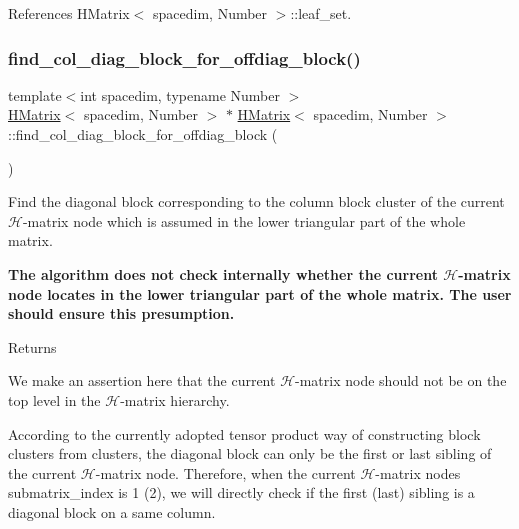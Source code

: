 References H\+Matrix$<$ spacedim, Number $>$\+::leaf\+\_\+set.

\mbox{\label{classHMatrix_a1ab763860706b9cbef8f5e73d995f29a}} 
\subsubsection{\texorpdfstring{find\+\_\+col\+\_\+diag\+\_\+block\+\_\+for\+\_\+offdiag\+\_\+block()}{find\_col\_diag\_block\_for\_offdiag\_block()}}
{\footnotesize\ttfamily template$<$int spacedim, typename Number $>$ \\
\hyperlink{classHMatrix}{H\+Matrix}$<$ spacedim, Number $>$ $\ast$ \hyperlink{classHMatrix}{H\+Matrix}$<$ spacedim, Number $>$\+::find\+\_\+col\+\_\+diag\+\_\+block\+\_\+for\+\_\+offdiag\+\_\+block (\begin{DoxyParamCaption}{ }\end{DoxyParamCaption})}

Find the diagonal block corresponding to the column block cluster of the current $\mathcal{H}$-\/matrix node which is assumed in the lower triangular part of the whole matrix.

{\bfseries The algorithm does not check internally whether the current $\mathcal{H}$-\/matrix node locates in the lower triangular part of the whole matrix. The user should ensure this presumption.}

\begin{DoxyReturn}{Returns}

\end{DoxyReturn}
We make an assertion here that the current $\mathcal{H}$-\/matrix node should not be on the top level in the $\mathcal{H}$-\/matrix hierarchy.

According to the currently adopted tensor product way of constructing block clusters from clusters, the diagonal block can only be the first or last sibling of the current $\mathcal{H}$-\/matrix node. Therefore, when the current $\mathcal{H}$-\/matrix node\textquotesingle{}s {\ttfamily submatrix\+\_\+index} is 1 (2), we will directly check if the first (last) sibling is a diagonal block on a same column.

